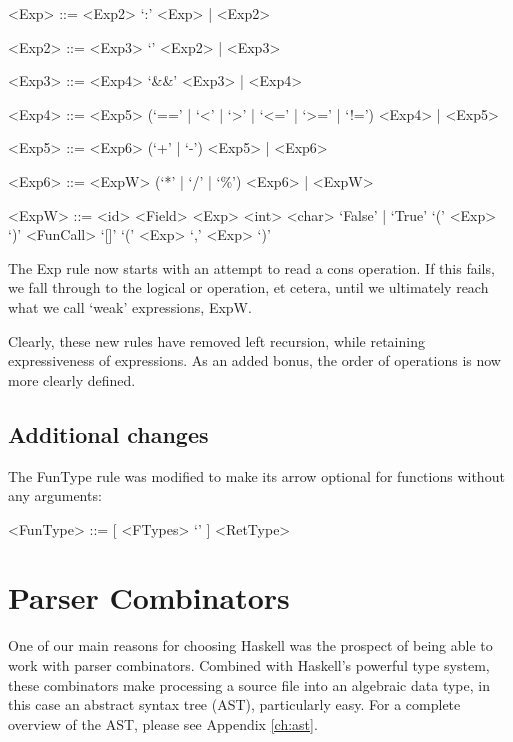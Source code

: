 \begin{framed}
	\begin{grammar}
		<Exp> ::= <Exp2> `:' <Exp> | <Exp2>

		<Exp2> ::= <Exp3> `\textbar\textbar' <Exp2> | <Exp3>

		<Exp3> ::= <Exp4> `\&\&' <Exp3> | <Exp4>

		<Exp4> ::= <Exp5> (`==' | `\textless' | `\textgreater' | `\textless=' | `\textgreater=' | `!=') <Exp4> | <Exp5>

		<Exp5> ::= <Exp6> (`+' | `-') <Exp5> | <Exp6>

		<Exp6> ::= <ExpW> (`*' | `/' | `\%') <Exp6> | <ExpW>

		<ExpW> ::= <id> <Field>
			\alt <Op1> <Exp>
			\alt <int>
			\alt <char>
			\alt `False' | `True'
			\alt `(' <Exp> `)'
			\alt `[]'
			\alt `(' <Exp> `,' <Exp> `)'
	\end{grammar}
\end{framed}

The \textsf{Exp} rule now starts with an attempt to read a cons operation.
If this fails, we fall through to the logical or operation, et cetera, until we ultimately reach what we call `weak' expressions, \textsf{ExpW}.

Clearly, these new rules have removed left recursion, while retaining expressiveness of expressions.
As an added bonus, the order of operations is now more clearly defined.

\subsection{Additional changes}

The \textsf{FunType} rule was modified to make its arrow optional for functions without any arguments:

\begin{framed}
	\begin{grammar}
	<FunType> ::= [ <FTypes> `\textrightarrow' ] <RetType>
	\end{grammar}
\end{framed}

\section{Parser Combinators}

One of our main reasons for choosing Haskell was the prospect of being able to work with parser combinators.
Combined with Haskell's powerful type system, these combinators make processing a source file into an algebraic data type, in this case an abstract syntax tree (AST), particularly easy.
For a complete overview of the AST, please see Appendix \ref{ch:ast}.

